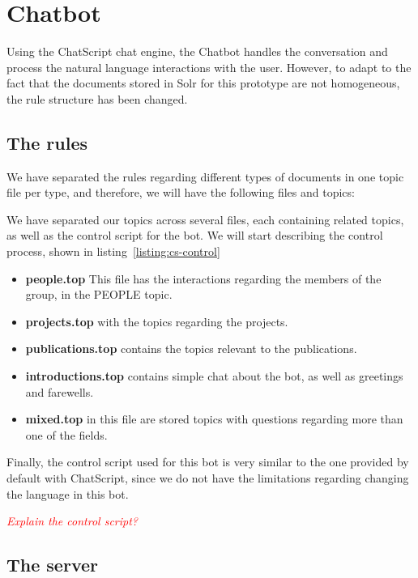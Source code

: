 \section{Chatbot}
\label{sec:chatbotgsi}

Using the ChatScript chat engine, the Chatbot handles the conversation and process the natural language interactions with the user. However, to adapt to the fact that the documents stored in Solr for this prototype are not homogeneous, the rule structure has been changed.

\subsection{The rules}

We have separated the rules regarding different types of documents in one topic file per type, and therefore, we will have the following files and topics:

We have separated our topics across several files, each containing related topics, as well as the control script for the bot. We will start describing the control process, shown in listing~\ref{listing:cs-control}


\begin{itemize}
 \item \textbf{people.top} This file has the interactions regarding the members of the group, in the PEOPLE topic.
 \item \textbf{projects.top} with the topics regarding the projects.
 \item \textbf{publications.top} contains the topics relevant to the publications.
 \item \textbf{introductions.top} contains simple chat about the bot, as well as greetings and farewells.
 \item \textbf{mixed.top} in this file are stored topics with questions regarding more than one of the fields.
\end{itemize}

Finally, the control script used for this bot is very similar to the one provided by default with ChatScript, since we do not have the limitations regarding changing the language in this bot.

\emph{\textcolor{red}{Explain the control script?}}

\subsection{The server}

